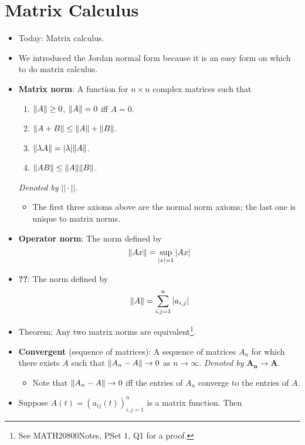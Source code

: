 \documentclass[../notes.tex]{subfiles}
\begin{document}
\section{Matrix Calculus}
\begin{itemize}
    \item {}Today: Matrix calculus.
    \item We introduced the Jordan normal form because it is an easy form on which to do matrix calculus.
    \item \textbf{Matrix norm}: A function for $n\times n$ complex matrices such that
    \begin{enumerate}
        \item $\norm{A}\geq 0$, $\norm{A}=0$ iff $A=0$.
        \item $\norm{A+B}\leq\norm{A}+\norm{B}$.
        \item $\norm{\lambda A}=|\lambda|\norm{A}$.
        \item $\norm{AB}\leq\norm{A}\norm{B}$.
    \end{enumerate}
    \emph{Denoted by} $\bm{||\cdot||}$.
    \begin{itemize}
        \item The first three axioms above are the normal norm axioms; the last one is unique to matrix norms.
    \end{itemize}
    \item \textbf{Operator norm}: The norm defined by
    \begin{equation*}
        \norm{Ax} = \sup_{|x|=1}|Ax|
    \end{equation*}
    \item \textbf{??}: The norm defined by
    \begin{equation*}
        \norm{A} = \sum_{i,j=1}^n|a_{i,j}|
    \end{equation*}
    \item Theorem: Any two matrix norms are equivalent\footnote{See MATH20800Notes, PSet 1, Q1 for a proof.}.
    \item \textbf{Convergent} (sequence of matrices): A sequence of matrices $A_n$ for which there exists $A$ such that $\norm{A_n-A}\to 0$ as $n\to\infty$. \emph{Denoted by} $\bm{A_n\to A}$.
    \begin{itemize}
        \item Note that $\norm{A_n-A}\to 0$ iff the entries of $A_n$ converge to the entries of $A$.
    \end{itemize}
    \item Suppose $A(t)=(a_{ij}(t))_{i,j=1}^n$ is a matrix function. Then

\end{itemize}
\end{document}
